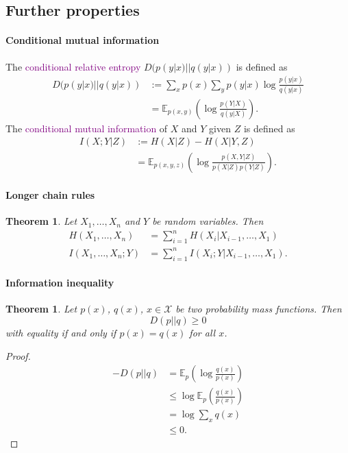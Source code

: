 \documentclass[a4paper, 11pt, openany]{book}
\numberwithin{equation}{section}
\theoremstyle{plain}
\newtheorem{theorem}	[equation]	{Theorem}
\theoremstyle{definition}
\newcommand{\expectation}{\mathbb{E}}
\newcommand{\Define}[1]{\textcolor{purple}{#1}}
\newcommand{\alphabet}[1]{\mathcal{#1}}
\begin{document}
\subsection{Further properties}


\paragraph{Conditional mutual information}

The \Define{conditional relative entropy} $D(p(y|x) || q(y|x))$ is defined as
\begin{align*}
	D(p(y|x) || q(y|x)) &:= \sum_x p(x) \sum_y p(y|x) \log \frac{p(y|x)}{q(y|x)}\\
	&= \expectation_{p(x,y)} \left( \log \frac{p(Y|X)}{q(y|X)} \right).
\end{align*}
The \Define{conditional mutual information} of $X$ and $Y$ given $Z$ is defined as
\begin{align*}
	I(X;Y|Z) &:= H(X|Z) - H(X|Y,Z)\\
	&= \expectation_{p(x,y,z)} \left( \log \frac{p(X,Y|Z)}{p(X|Z)p(Y|Z)} \right).
\end{align*}


\paragraph{Longer chain rules}

\begin{theorem}
Let $X_1,\ldots,X_n$ and $Y$ be random variables. Then
\begin{align*}
	H(X_1,\ldots,X_n) &= \sum_{i=1}^n H(X_i | X_{i-1}, \ldots, X_1)\\
	I(X_1,\ldots,X_n; Y) &= \sum_{i=1}^n I(X_i; Y | X_{i-1}, \ldots, X_1).
\end{align*}
\end{theorem}






\paragraph{Information inequality}

\begin{theorem}
Let $p(x)$, $q(x)$, $x \in \alphabet{X}$ be two probability mass functions. Then
\[
	D(p||q) \ge 0
\]
with equality if and only if $p(x) = q(x)$ for all $x$.
\end{theorem}

\begin{proof}
\begin{align*}
	-D(p||q) &= \expectation_p \left( \log \frac{q(x)}{p(x)} \right)\\
	&\le \log \expectation_p \left( \frac{q(x)}{p(x)} \right)\\
	&= \log \sum_x q(x)\\
	&\le 0.
\end{align*}
\end{proof}
\end{document}
